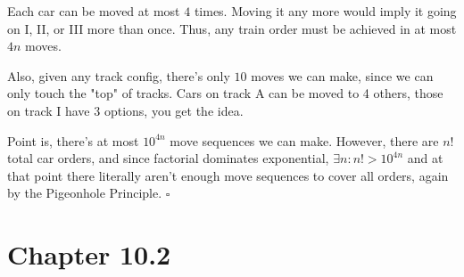 \documentclass[12pt]{article}
\begin{document}
\begin{enumerate}
        Each car can be moved at most $4$ times.
        Moving it any more would imply it going on I, II, or III more than once.
        Thus, any train order must be achieved in at most $4n$ moves.

        Also, given any track config, there's only $10$ moves we can make,
        since we can only touch the "top" of tracks.
        Cars on track A can be moved to 4 others,
        those on track I have 3 options, you get the idea.

        Point is, there's at most $10^{4n}$ move sequences we can make.
        However, there are $n!$ total car orders, and since
        factorial dominates exponential, $\exists n: n! > 10^{4n}$ and at that point
        there literally aren't enough move sequences to cover all orders,
        again by the Pigeonhole Principle. $\square$
\end{enumerate}

\section{Chapter 10.2}
\end{document}
